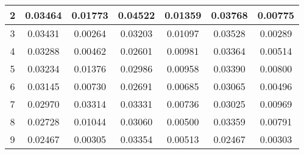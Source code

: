 \begin{table}[t]
\begin{tabular}{|c|c|c|c|c|c|c|}
2                               & 0.03464       & 0.01773                                                                & 0.04522       & 0.01359                                                                & 0.03768       & 0.00775                                                                \\ \hline
3                               & 0.03431       & 0.00264                                                                & 0.03203       & 0.01097                                                                & 0.03528       & 0.00289                                                                \\ \hline
4                               & 0.03288       & 0.00462                                                                & 0.02601       & 0.00981                                                                & 0.03364       & 0.00514                                                                \\ \hline
5                               & 0.03234       & 0.01376                                                                & 0.02986       & 0.00958                                                                & 0.03390       & 0.00800                                                                \\ \hline
6                               & 0.03145       & 0.00730                                                                & 0.02691       & 0.00685                                                                & 0.03065       & 0.00496                                                                \\ \hline
7                               & 0.02970       & 0.03314                                                                & 0.03331       & 0.00736                                                                & 0.03025       & 0.00969                                                                \\ \hline
8                               & 0.02728       & 0.01044                                                                & 0.03060       & 0.00500                                                                & 0.03359       & 0.00791                                                                \\ \hline
9                               & 0.02467       & 0.00305                                                                & 0.03354       & 0.00513                                                                & 0.02467       & 0.00303                                                                \\ \hline

\end{tabular}
\end{table}
